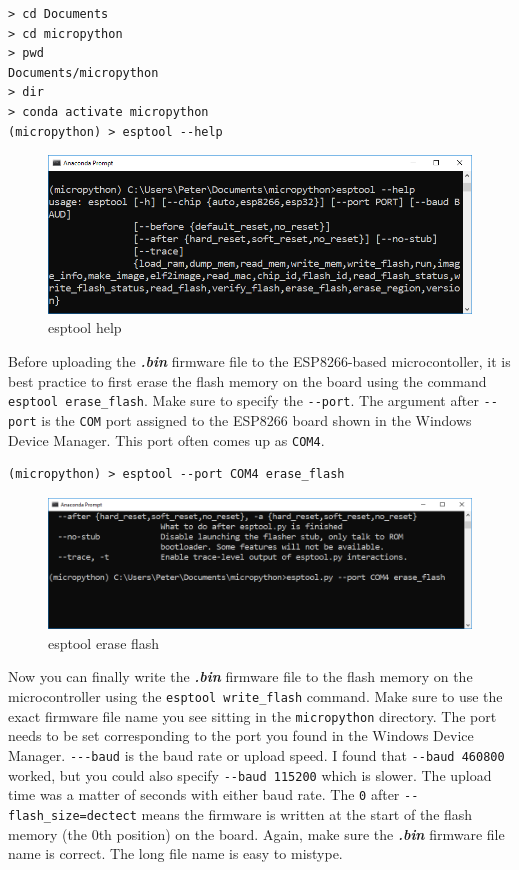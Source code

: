 \documentclass{book}
\makeatletter
\def\maxwidth{\ifdim\Gin@nat@width>\linewidth\linewidth
    \else\Gin@nat@width\fi}
\let\Oldincludegraphics\includegraphics
\renewcommand{\includegraphics}[1]{\Oldincludegraphics[width=.8\maxwidth]{#1}}
\makeatother
\begin{document}
\begin{lstlisting}
> cd Documents
> cd micropython
> pwd
Documents/micropython
> dir
> conda activate micropython
(micropython) > esptool --help
\end{lstlisting}

\begin{figure}
\centering
\includegraphics{images/esptool_help.PNG}
\caption{esptool help}
\end{figure}

Before uploading the \textbf{\emph{.bin}} firmware file to the
ESP8266-based microcontoller, it is best practice to first erase the
flash memory on the board using the command
\lstinline!esptool erase_flash!. Make sure to specify the
\lstinline!--port!. The argument after \lstinline!--port! is the
\lstinline!COM! port assigned to the ESP8266 board shown in the Windows
Device Manager. This port often comes up as \lstinline!COM4!.

\begin{lstlisting}
(micropython) > esptool --port COM4 erase_flash
\end{lstlisting}

\begin{figure}
\centering
\includegraphics{images/esptool_erase_flash.PNG}
\caption{esptool erase flash}
\end{figure}

Now you can finally write the \textbf{\emph{.bin}} firmware file to the
flash memory on the microcontroller using the
\lstinline!esptool write_flash! command. Make sure to use the exact
firmware file name you see sitting in the \lstinline!micropython!
directory. The port needs to be set corresponding to the port you found
in the Windows Device Manager. \lstinline!---baud! is the baud rate or
upload speed. I found that \lstinline!--baud 460800! worked, but you
could also specify \lstinline!--baud 115200! which is slower. The upload
time was a matter of seconds with either baud rate. The \lstinline!0!
after \lstinline!--flash_size=dectect! means the firmware is written at
the start of the flash memory (the 0th position) on the board. Again,
make sure the \textbf{\emph{.bin}} firmware file name is correct. The
long file name is easy to mistype.
\end{document}
